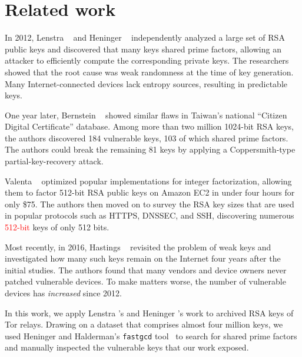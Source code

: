\section{Related work}
In 2012, Lenstra \ea~\cite{Lenstra2012a} and Heninger \ea~\cite{Heninger2012a}
independently analyzed a large set of RSA public keys and discovered that many
keys shared prime factors, allowing an attacker to efficiently compute the
corresponding private keys.  The researchers showed that the root cause was weak
randomness at the time of key generation.  Many Internet-connected devices lack
entropy sources, resulting in predictable keys.

One year later, Bernstein \ea~\cite{Bernstein2013a} showed similar flaws in
Taiwan's national ``Citizen Digital Certificate'' database.  Among more than two
million 1024-bit RSA keys, the authors discovered 184 vulnerable keys, 103 of
which shared prime factors.  The authors could break the remaining 81 keys by
applying a Coppersmith-type partial-key-recovery attack.

Valenta \ea~\cite{Valenta2016a} optimized popular implementations for integer
factorization, allowing them to factor 512-bit RSA public keys on Amazon EC2 in
under four hours for only \$75.  The authors then moved on to survey the RSA key
sizes that are used in popular protocols such as HTTPS, DNSSEC, and SSH,
discovering numerous \textcolor{red}{512-bit} keys of only 512 bits.

Most recently, in 2016, Hastings \ea~\cite{Hastings2016a} revisited the problem
of weak keys and investigated how many such keys remain on the Internet four
years after the initial studies.  The authors found that many vendors and device
owners never patched vulnerable devices.  To make matters worse, the number of
vulnerable devices has \emph{increased} since 2012.

In this work, we apply Lenstra \ea's and Heninger \ea's work to archived RSA
keys of Tor relays.  Drawing on a dataset that comprises almost four million
keys, we used Heninger and Halderman's \texttt{fastgcd} tool~\cite{fastgcd} to
search for shared prime factors and manually inspected the vulnerable keys that
our work exposed.
